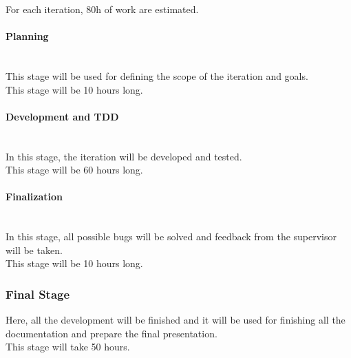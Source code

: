 For each iteration, 80h of work are estimated.
\paragraph{Planning}\\
This stage will be used for defining the scope of the iteration and goals.\\

This stage will be 10 hours long.
\paragraph{Development and TDD}\\
In this stage, the iteration will be developed and tested.\\

This stage will be 60 hours long.
\paragraph{Finalization}\\
In this stage, all possible bugs will be solved and feedback from the supervisor will be taken.\\

This stage will be 10 hours long.


\subsubsection{Final Stage}
Here, all the development will be finished and it will be used for finishing all the documentation and prepare the final presentation.\\

This stage will take 50 hours.

